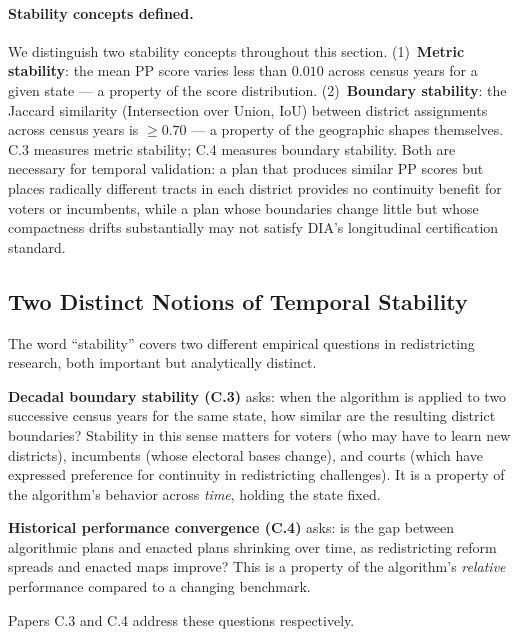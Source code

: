 
\paragraph{Stability concepts defined.}
We distinguish two stability concepts throughout this section.
(1)~\textbf{Metric stability}: the mean PP score varies less than $0.010$
across census years for a given state --- a property of the score
distribution. (2)~\textbf{Boundary stability}: the Jaccard similarity
(Intersection over Union, IoU) between district assignments across census
years is $\geq 0.70$ --- a property of the geographic shapes themselves.
C.3 measures metric stability; C.4 measures boundary stability. Both are
necessary for temporal validation: a plan that produces similar PP scores
but places radically different tracts in each district provides no
continuity benefit for voters or incumbents, while a plan whose boundaries
change little but whose compactness drifts substantially may not satisfy
DIA's longitudinal certification standard.

\subsection{Two Distinct Notions of Temporal Stability}

The word ``stability'' covers two different empirical questions in
redistricting research, both important but analytically distinct.

\textbf{Decadal boundary stability (C.3)} asks: when the algorithm is
applied to two successive census years for the same state, how similar
are the resulting district boundaries? Stability in this sense matters
for voters (who may have to learn new districts), incumbents (whose
electoral bases change), and courts (which have expressed preference
for continuity in redistricting challenges). It is a property of the
algorithm's behavior across \emph{time}, holding the state fixed.

\textbf{Historical performance convergence (C.4)} asks: is the gap
between algorithmic plans and enacted plans shrinking over time, as
redistricting reform spreads and enacted maps improve? This is a
property of the algorithm's \emph{relative} performance compared to
a changing benchmark.

Papers C.3 \citep{dellalibera2026c3} and C.4 \citep{dellalibera2026c4}
address these questions respectively.

